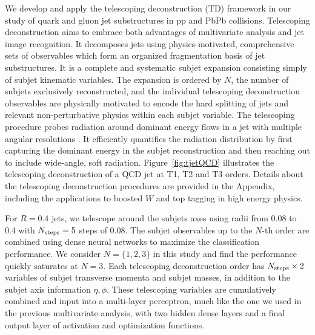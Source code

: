 \documentclass[notoc]{JHEP3}
\begin{document}
We develop and apply the telescoping deconstruction (TD) framework in our study of quark and gluon jet substructures in pp and PbPb collisions. Telescoping deconstruction aims to embrace both advantages of multivariate analysis and jet image recognition. It decomposes jets using physics-motivated, comprehensive sets of observables which form an organized fragmentation basis of jet substructures. It is a complete and systematic subjet expansion consisting simply of subjet kinematic variables. The expansion is ordered by $N$, the number of subjets exclusively reconstructed, and the individual telescoping deconstruction observables are physically motivated to encode the hard splitting of jets and relevant non-perturbative physics within each subjet variable. The telescoping procedure probes radiation around dominant energy flows in a jet with multiple angular resolutions \cite{Chien:2013kca,Chien:2014hla,Chien:2017xrb}. It efficiently quantifies the radiation distribution by first capturing the dominant energy in the subjet reconstruction and then reaching out to include wide-angle, soft radiation. Figure~\ref{fig:tjetQCD} illustrates the telescoping deconstruction of a QCD jet at T1, T2 and T3 orders. Details about the telescoping deconstruction procedures are provided in the Appendix, including the applications to boosted $W$ and top tagging in high energy physics.

For $R=0.4$ jets, we telescope around the subjets axes using radii from 0.08 to 0.4 with $N_{\rm steps} = 5$ steps of 0.08. The subjet observables up to the $N$-th order are combined using dense neural networks to maximize the classification performance. We consider $N=\{1,2,3\}$ in this study and find the performance quickly saturates at $N=3$. Each telescoping deconstruction order has $N_{\rm steps} \times 2$ variables of subjet transverse momenta and subjet masses, in addition to the subjet axis information $\eta, \phi$. %
These telescoping variables are cumulatively combined and input into a multi-layer perceptron, much like the one we used in the previous multivariate analysis, with two hidden dense layers and a final output layer of activation and optimization functions.
\end{document}
